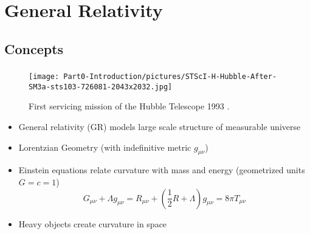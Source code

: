 \section{General Relativity}

\subsection{Concepts}
\begin{frame}
	\frametitle{\insertsubsection}
	\begin{minipage}{0.3\textwidth}
		\begin{figure}
			\centering
			\texttt{[image: Part0-Introduction/pictures/STScI-H-Hubble-After-SM3a-sts103-726081-2043x2032.jpg]}
			\vspace{0.15cm}
			\caption{First servicing mission of the Hubble Telescope 1993 \cite{nasaHubbleSiteImageHubble1999}.}
		\end{figure}
	\end{minipage}%
	\begin{minipage}{0.7\textwidth}
		\begin{itemize}[<+->]
			\item General relativity (GR) models large scale structure of measurable universe
			\item Lorentzian Geometry (with indefinitive metric $g_{\mu\nu}$)
			\item Einstein equations relate curvature with mass and energy (geometrized units $G=c=1$)
			\[G_{\mu\nu} + \Lambda g_{\mu\nu}=R_{\mu\nu}+\left(\frac{1}{2}R+\Lambda\right)g_{\mu\nu}=8\pi T_{\mu\nu}\]
			\item Heavy objects create curvature in space
		\end{itemize}
	\end{minipage}
\end{frame}


